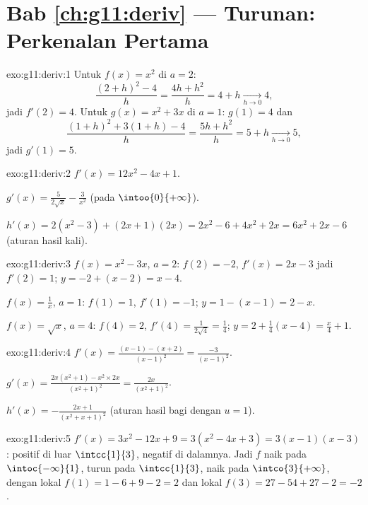 \section*{Bab \ref{ch:g11:deriv} --- Turunan: Perkenalan Pertama}

\begin{solution}{exo:g11:deriv:1}
Untuk $f(x) = x^2$ di $a = 2$:
\[
\frac{(2+h)^2 - 4}{h} = \frac{4h + h^2}{h} = 4 + h
\xrightarrow[h\to0]{} 4,
\]
jadi $f'(2) = 4$. Untuk $g(x) = x^2 + 3x$ di $a = 1$: $g(1) = 4$ dan
\[
\frac{(1+h)^2 + 3(1+h) - 4}{h} = \frac{5h + h^2}{h} = 5 + h
\xrightarrow[h\to0]{} 5,
\]
jadi $g'(1) = 5$.
\end{solution}

\begin{solution}{exo:g11:deriv:2}
$f'(x) = 12x^2 - 4x + 1$.

$g'(x) = \frac{5}{2\sqrt x} - \frac{3}{x^2}$ (pada $\intoo{0}{+\infty}$).

$h'(x) = 2(x^2 - 3) + (2x+1)(2x) = 2x^2 - 6 + 4x^2 + 2x
= 6x^2 + 2x - 6$ (aturan hasil kali).
\end{solution}

\begin{solution}{exo:g11:deriv:3}
$f(x) = x^2 - 3x$, $a = 2$: $f(2) = -2$, $f'(x) = 2x - 3$ jadi $f'(2) = 1$;
 $y = -2 + (x - 2) = x - 4$.

$f(x) = \frac1x$, $a = 1$: $f(1) = 1$, $f'(1) = -1$; 
$y = 1 - (x - 1) = 2 - x$.

$f(x) = \sqrt x$, $a = 4$: $f(4) = 2$, $f'(4) = \frac{1}{2\sqrt4} =
\frac14$;  $y = 2 + \frac14(x - 4) = \frac{x}{4} + 1$.
\end{solution}

\begin{solution}{exo:g11:deriv:4}
$f'(x) = \frac{(x-1) - (x+2)}{(x-1)^2} = \frac{-3}{(x-1)^2}$.

$g'(x) = \frac{2x(x^2+1) - x^2 \times 2x}{(x^2+1)^2}
= \frac{2x}{(x^2+1)^2}$.

$h'(x) = -\frac{2x+1}{(x^2+x+1)^2}$ (aturan hasil bagi dengan $u = 1$).
\end{solution}

\begin{solution}{exo:g11:deriv:5}
$f'(x) = 3x^2 - 12x + 9 = 3(x^2 - 4x + 3) = 3(x-1)(x-3)$: positif
di luar $\intcc{1}{3}$, negatif di dalamnya. Jadi $f$ naik pada
$\intoc{-\infty}{1}$, turun pada $\intcc{1}{3}$, naik pada
$\intco{3}{+\infty}$, dengan  lokal $f(1) = 1 - 6 + 9 - 2 = 2$ dan
 lokal $f(3) = 27 - 54 + 27 - 2 = -2$.
\end{solution}


